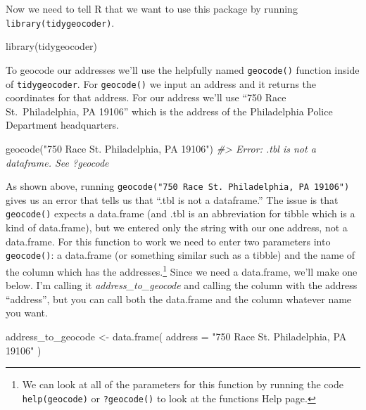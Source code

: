 \documentclass[
]{krantz}
\makeatletter
\newenvironment{Shaded}{\begin{snugshade}}{\end{snugshade}}
\newcommand{\AttributeTok}[1]{\textcolor[rgb]{0.61,0.61,0.61}{#1}}
\newcommand{\CommentTok}[1]{\textcolor[rgb]{0.37,0.37,0.37}{\textit{#1}}}
\newcommand{\FunctionTok}[1]{\textcolor[rgb]{0,0,0}{#1}}
\newcommand{\NormalTok}[1]{#1}
\newcommand{\OtherTok}[1]{\textcolor[rgb]{0.37,0.37,0.37}{#1}}
\newcommand{\StringTok}[1]{\textcolor[rgb]{0.5,0.5,0.5}{#1}}
\newenvironment{kframe}{%
\medskip{}
\setlength{\fboxsep}{.8em}
 \def\at@end@of@kframe{}%
 \ifinner\ifhmode%
  \def\at@end@of@kframe{\end{minipage}}%
  \begin{minipage}{\columnwidth}%
 \fi\fi%
 \def\FrameCommand##1{\hskip\@totalleftmargin \hskip-\fboxsep
 \colorbox{shadecolor}{##1}\hskip-\fboxsep
     \hskip-\linewidth \hskip-\@totalleftmargin \hskip\columnwidth}%
 \MakeFramed {\advance\hsize-\width
   \@totalleftmargin\z@ \linewidth\hsize
   \@setminipage}}%
 {\par\unskip\endMakeFramed%
 \at@end@of@kframe}
\renewenvironment{Shaded}{\begin{kframe}}{\end{kframe}}
\makeatother
\begin{document}
Now we need to tell R that we want to use this package by
running \texttt{library(tidygeocoder)}.

\begin{Shaded}
\begin{Highlighting}[]
\FunctionTok{library}\NormalTok{(tidygeocoder)}
\end{Highlighting}
\end{Shaded}

To geocode our addresses we'll use the helpfully named
\texttt{geocode()} function inside of \texttt{tidygeocoder}.
For \texttt{geocode()} we input an address and it returns
the coordinates for that address. For our address we'll use
``750 Race St.~Philadelphia, PA 19106'' which is the address
of the Philadelphia Police Department headquarters.

\begin{Shaded}
\begin{Highlighting}[]
\FunctionTok{geocode}\NormalTok{(}\StringTok{"750 Race St. Philadelphia, PA 19106"}\NormalTok{)}
\CommentTok{\#\textgreater{} Error: .tbl is not a dataframe. See ?geocode}
\end{Highlighting}
\end{Shaded}

As shown above, running
\texttt{geocode("750\ Race\ St.\ Philadelphia,\ PA\ 19106")}
gives us an error that tells us that ``.tbl is not a
dataframe.'' The issue is that \texttt{geocode()} expects a
data.frame (and .tbl is an abbreviation for tibble which is
a kind of data.frame), but we entered only the string with
our one address, not a data.frame. For this function to work
we need to enter two parameters into \texttt{geocode()}: a
data.frame (or something similar such as a tibble) and the
name of the column which has the addresses.\footnote{We can
  look at all of the parameters for this function by running
  the code \texttt{help(geocode)} or \texttt{?geocode()} to
  look at the functions Help page.} Since we need a
data.frame, we'll make one below. I'm calling it
\emph{address\_to\_geocode} and calling the column with the
address ``address'', but you can call both the data.frame
and the column whatever name you want.

\begin{Shaded}
\begin{Highlighting}[]
\NormalTok{address\_to\_geocode }\OtherTok{\textless{}{-}} \FunctionTok{data.frame}\NormalTok{(}
  \AttributeTok{address =}
    \StringTok{"750 Race St. Philadelphia, PA 19106"}
\NormalTok{)}
\end{Highlighting}
\end{Shaded}
\end{document}
